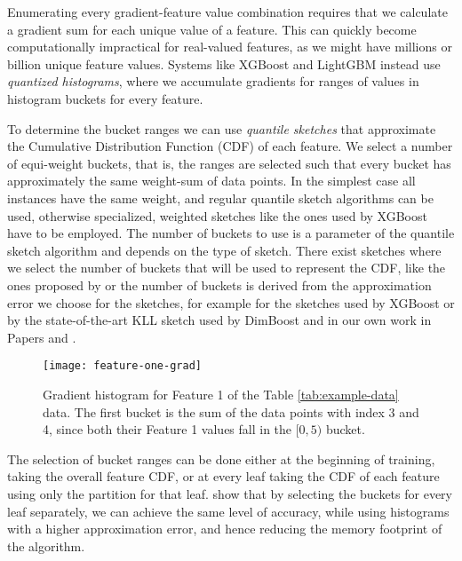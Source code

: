 Enumerating every gradient-feature value combination requires that we calculate
a gradient sum for each unique value
of a feature. This can quickly become computationally impractical for real-valued features, as we might have millions or billion unique feature values.
Systems like XGBoost and LightGBM instead use \emph{quantized histograms},
where we accumulate gradients for ranges of values in histogram buckets for every feature.

To determine the bucket ranges we
can use \emph{quantile sketches} \cite{greenwald2016quantiles} that approximate
the Cumulative Distribution Function (CDF) of each feature. We select a number of
equi-weight buckets, that is, the ranges are selected such that every bucket
has approximately the same weight-sum of data points. In the simplest case
all instances have the same weight, and regular quantile sketch algorithms
can be used, otherwise specialized, weighted sketches like the ones used by XGBoost
have to be employed.
The number of buckets to use is a
parameter of the quantile sketch algorithm and depends on the type of sketch.
There exist sketches where we select the number of buckets that
will be used to represent the CDF, like the ones proposed by \citet{BenHaim2010parallel}
or the number of buckets is derived from the approximation error we choose for the sketches, for example
for the sketches used by XGBoost or by the state-of-the-art KLL sketch \cite{karnin2016kll}
used by DimBoost \cite{dimboost} and in our own work in Papers \uncertaintreesNum and \blockgbtNum.

\begin{figure}
	\centering
	\texttt{[image: feature-one-grad]}
	\caption{Gradient histogram for Feature 1 of the Table \ref{tab:example-data} data.
	The first bucket is the sum of the data points with index 3 and 4, since both their Feature 1
	values fall in the $[0, 5)$ bucket.}
	\label{fig:gradient-feature-one}
\end{figure}


The selection of bucket ranges can be done either at the beginning of training, taking the
overall feature CDF, or at every leaf taking the CDF of each feature using only the
partition for that leaf. \citet{xgboost} show that by selecting the buckets for every
leaf separately, we can achieve the same level of accuracy, while using histograms with a higher approximation error, and hence reducing the memory footprint of the algorithm.


